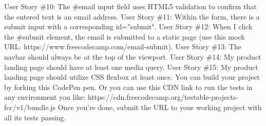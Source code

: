 \documentclass{article}%
\begin{document}
User Story \#10: The \#email input field uses HTML5 validation to confirm that the entered text is an email address.\newline%
User Story \#11: Within the form, there is a submit input with a corresponding id="submit".\newline%
User Story \#12: When I click the \#submit element, the email is submitted to a static page (use this mock URL: https://www.freecodecamp.com/email{-}submit).\newline%
User Story \#13: The navbar should always be at the top of the viewport.\newline%
User Story \#14: My product landing page should have at least one media query.\newline%
User Story \#15: My product landing page should utilize CSS flexbox at least once.\newline%
You can build your project by forking this CodePen pen. Or you can use this CDN link to run the tests in any environment you like: https://cdn.freecodecamp.org/testable{-}projects{-}fcc/v1/bundle.js\newline%
Once you're done, submit the URL to your working project with all its tests passing.\newline%

%
\end{document}
